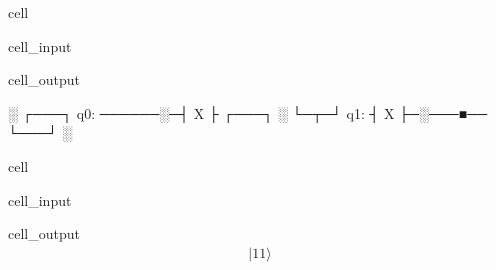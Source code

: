 \documentclass[letterpaper,10pt,english]{jupyterBook}
\begin{document}
\begin{sphinxuseclass}{cell}\begin{sphinxVerbatimInput}

\begin{sphinxuseclass}{cell_input}
\begin{sphinxVerbatim}[commandchars=\\\{\}]
  
\end{sphinxVerbatim}

\end{sphinxuseclass}\end{sphinxVerbatimInput}
\begin{sphinxVerbatimOutput}

\begin{sphinxuseclass}{cell_output}
\begin{sphinxVerbatim}[commandchars=\\\{\}]
           ░ ┌───┐
q\PYGZus{}0: ──────░─┤ X ├
     ┌───┐ ░ └─┬─┘
q\PYGZus{}1: ┤ X ├─░───■──
     └───┘ ░
\end{sphinxVerbatim}

\end{sphinxuseclass}\end{sphinxVerbatimOutput}

\end{sphinxuseclass}
\begin{sphinxuseclass}{cell}\begin{sphinxVerbatimInput}

\begin{sphinxuseclass}{cell_input}
\begin{sphinxVerbatim}[commandchars=\\\{\}]
\end{sphinxVerbatim}

\end{sphinxuseclass}\end{sphinxVerbatimInput}
\begin{sphinxVerbatimOutput}

\begin{sphinxuseclass}{cell_output}\begin{equation*}
\begin{split} |11\rangle\end{split}
\end{equation*}
\end{sphinxuseclass}\end{sphinxVerbatimOutput}

\end{sphinxuseclass}
\end{document}
